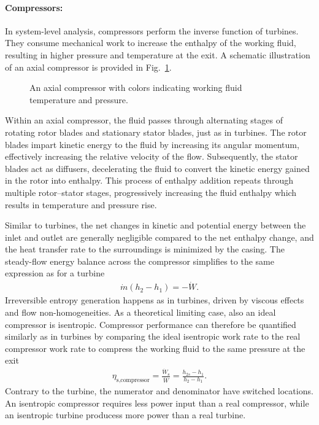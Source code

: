\paragraph{Compressors:} In system-level analysis, compressors perform the inverse function of turbines. They consume mechanical work to increase the enthalpy of the working fluid, resulting in higher pressure and temperature at the exit. A schematic illustration of an axial compressor is provided in Fig.~\ref{fig:compressor}.
\begin{figure}[!htb]
    \centering
    
    \caption{An axial compressor with colors indicating working fluid temperature and pressure.}
    \label{fig:compressor}
\end{figure}

Within an axial compressor, the fluid passes through alternating stages of rotating rotor blades and stationary stator blades, just as in turbines. The rotor blades impart kinetic energy to the fluid by increasing its angular momentum, effectively increasing the relative velocity of the flow. Subsequently, the stator blades act as diffusers, decelerating the fluid to convert the kinetic energy gained in the rotor into enthalpy. This process of enthalpy addition repeats through multiple rotor--stator stages, progressively increasing the fluid enthalpy which results in temperature and pressure rise. 

Similar to turbines, the net changes in kinetic and potential energy between the inlet and outlet are generally negligible compared to the net enthalpy change, and the heat transfer rate to the surroundings is minimized by the casing. The steady-flow energy balance across the compressor simplifies to the same expression as for a turbine
\begin{align}
    \dot{m}(h_2-h_1) = -\dot{W}.
\end{align}
Irreversible entropy generation happens as in turbines, driven by viscous effects and flow non-homogeneities. As a theoretical limiting case, also an ideal compressor is isentropic. Compressor performance can therefore be quantified similarly as in turbines by comparing the ideal isentropic work rate to the real compressor work rate to compress the working fluid to the same pressure at the exit
\begin{align}
    \eta_\text{s,compressor} = \frac{\dot{W}_\text{s}}{\dot{W}} = \frac{h_{2s}-h_1}{h_2-h_1}.
\end{align}
Contrary to the turbine, the numerator and denominator have switched locations. An isentropic compressor requires less power input than a real compressor, while an isentropic turbine producess more power than a real turbine.

